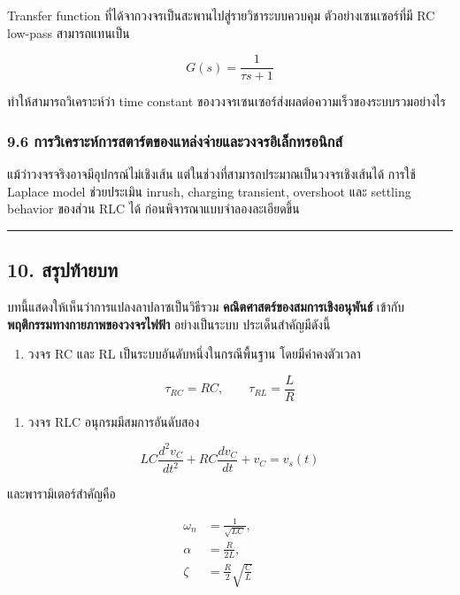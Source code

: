 Transfer function ที่ได้จากวงจรเป็นสะพานไปสู่รายวิชาระบบควบคุม ตัวอย่างเซนเซอร์ที่มี RC low-pass สามารถแทนเป็น

\[
G(s)=\frac{1}{\tau s+1}
\]

ทำให้สามารถวิเคราะห์ว่า time constant ของวงจรเซนเซอร์ส่งผลต่อความเร็วของระบบรวมอย่างไร

\subsubsection{9.6 การวิเคราะห์การสตาร์ตของแหล่งจ่ายและวงจรอิเล็กทรอนิกส์}

แม้ว่าวงจรจริงอาจมีอุปกรณ์ไม่เชิงเส้น แต่ในช่วงที่สามารถประมาณเป็นวงจรเชิงเส้นได้ การใช้ Laplace model ช่วยประเมิน inrush, charging transient, overshoot และ settling behavior ของส่วน RLC ได้ ก่อนพิจารณาแบบจำลองละเอียดขึ้น

\par\noindent\rule{\textwidth}{0.4pt}\par

\subsection{10. สรุปท้ายบท}

บทนี้แสดงให้เห็นว่าการแปลงลาปลาซเป็นวิธีรวม \textbf{คณิตศาสตร์ของสมการเชิงอนุพันธ์} เข้ากับ \textbf{พฤติกรรมทางกายภาพของวงจรไฟฟ้า} อย่างเป็นระบบ ประเด็นสำคัญมีดังนี้

\begin{enumerate}
    \item วงจร RC และ RL เป็นระบบอันดับหนึ่งในกรณีพื้นฐาน โดยมีค่าคงตัวเวลา
\end{enumerate}

\[
\tau_{RC}=RC,\qquad \tau_{RL}=\frac{L}{R}
\]

\begin{enumerate}
    \item วงจร RLC อนุกรมมีสมการอันดับสอง
\end{enumerate}

\[
LC\frac{d^2v_C}{dt^2}+RC\frac{dv_C}{dt}+v_C=v_s(t)
\]

และพารามิเตอร์สำคัญคือ

\[
\begin{aligned}
    \omega_n&=\frac{1}{\sqrt{LC}},\qquad \\
    \alpha&=\frac{R}{2L},\qquad \\
    \zeta&=\frac{R}{2}\sqrt{\frac{C}{L}}
\end{aligned}
\]

